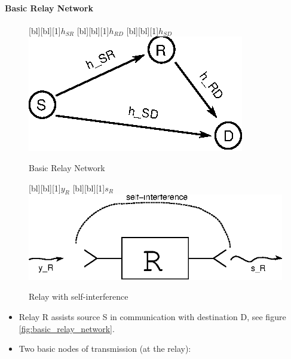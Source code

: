\documentclass[a4paper, 10pt]{article}
\begin{document}
\paragraph{Basic Relay Network}
\begin{figure}[th]
	\begin{minipage}[t]{0.38\textwidth}
		[bl][bl][1]{$h_{SR}$}
		[bl][bl][1]{$h_{RD}$}
		[bl][bl][1]{$h_{SD}$}
		\includegraphics[width = \textwidth]{Basic_Relay_Network}	
		\caption{Basic Relay Network}
		\label{fig:basic_relay_network}	
	\end{minipage}		
	\hfill
	\begin{minipage}[t]{0.46\textwidth}	
		\centering
		[bl][bl][1]{$y_{R}$}
		[bl][bl][1]{$s_{R}$}
		\includegraphics[width = 1.2\textwidth]{Relay_self_interference}	
		\caption{Relay with self-interference}
		\label{fig:relay_self_interference}
	\end{minipage}
\end{figure}

\begin{itemize}
	\item Relay R assists source S in communication with destination D, see figure \ref{fig:basic_relay_network}.
	\item Two basic nodes of transmission (at the relay):
\end{itemize}
\end{document}
